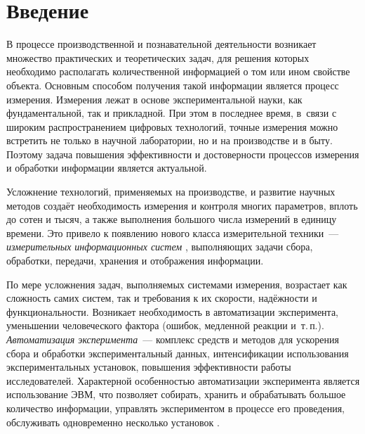 \documentclass[a4paper, 14pt, titlepage]{extarticle}
\newcommand\sectiontoc[1]{\section*{#1}\addcontentsline{toc}{section}{#1}}
\newcommand{\term}[1]{\emph{#1}}
\let\oldsection\section
\renewcommand{\section}{\newpage\oldsection}
\begin{document}

    \clearpage
    \tableofcontents

  \sectiontoc{Введение}\label{sec:intro}

  В процессе производственной и познавательной деятельности возникает множество практических и
  теоретических задач, для решения которых необходимо располагать количественной информацией о том
  или ином свойстве объекта. Основным способом получения такой информации является процесс измерения.
  Измерения лежат в основе экспериментальной науки, как фундаментальной, так и прикладной. При этом
  в последнее время, в~связи с широким распространением цифровых технологий, точные измерения можно
  встретить не только в научной лаборатории, но и на производстве и в быту.
  Поэтому задача повышения эффективности и достоверности процессов измерения и обработки информации
  является актуальной.

  Усложнение технологий, применяемых на производстве, и развитие научных методов создаёт
  необходимость измерения и контроля многих параметров, вплоть до сотен и тысяч, а также
  выполнения большого числа измерений в единицу времени. Это привело к появлению нового класса
  измерительной техники~--- \term{измерительных информационных систем} \cite{rannev-iis,rannev-meas-tech},
  выполняющих задачи сбора, обработки, передачи, хранения и отображения информации.

  По мере усложнения задач, выполняемых системами измерения, возрастает как сложность самих систем,
  так и требования к их скорости, надёжности и функциональности. Возникает необходимость в
  автоматизации эксперимента, уменьшении человеческого фактора (ошибок, медленной реакции и~т.\,п.).
  \term{Автоматизация эксперимента}~--- комплекс
  средств и методов для ускорения сбора и обработки экспериментальный данных, интенсификации
  использования экспериментальных установок, повышения эффективности работы исследователей.
  Характерной особенностью автоматизации эксперимента является использование ЭВМ, что позволяет
  собирать, хранить и обрабатывать большое количество информации, управлять экспериментом в процессе
  его проведения, обслуживать одновременно несколько установок \cite{petronevich-automation,sokolov-auto-measure}.
\end{document}
